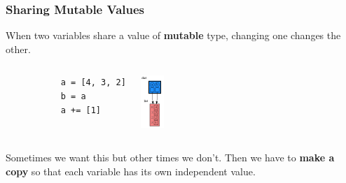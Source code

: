 \documentclass[10pt, colorlinks=true, urlcolor=blue]{beamer}
\begin{document}
\begin{frame}[fragile]
  \frametitle {Sharing Mutable Values}
  When two variables share a value of \textbf{mutable} type, changing one changes the other.
  \vspace{1em}
\begin{columns}
  \begin{verbatim}
           a = [4, 3, 2]
           b = a
           a += [1]
    \end{verbatim}
  \begin{center}\includegraphics[width=0.25\textwidth]{figures/sharing.png}\end{center}
\end{columns}
\vspace{1em}
Sometimes we want this but other times we don't. Then we have to \textbf{make a copy} so that each variable has its own independent value.
\end{frame}
\end{document}
